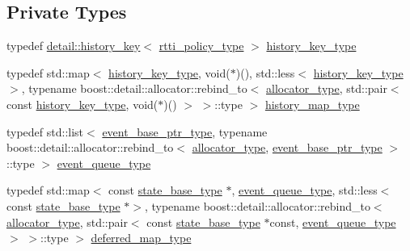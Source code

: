 \subsection*{Private Types}
\begin{DoxyCompactItemize}
\item 
typedef \mbox{\hyperlink{classboost_1_1statechart_1_1detail_1_1history__key}{detail\+::history\+\_\+key}}$<$ \mbox{\hyperlink{classboost_1_1statechart_1_1state__machine_af2a620c579a5248103aee4d3ccb4d632}{rtti\+\_\+policy\+\_\+type}} $>$ \mbox{\hyperlink{classboost_1_1statechart_1_1state__machine_a4f8e1e85e0ba11488c57318b61950e32}{history\+\_\+key\+\_\+type}}
\item 
typedef std\+::map$<$ \mbox{\hyperlink{classboost_1_1statechart_1_1state__machine_a4f8e1e85e0ba11488c57318b61950e32}{history\+\_\+key\+\_\+type}}, void($\ast$)(), std\+::less$<$ \mbox{\hyperlink{classboost_1_1statechart_1_1state__machine_a4f8e1e85e0ba11488c57318b61950e32}{history\+\_\+key\+\_\+type}} $>$, typename boost\+::detail\+::allocator\+::rebind\+\_\+to$<$ \mbox{\hyperlink{classboost_1_1statechart_1_1state__machine_a7345d6567cd1a829234bbb7f6c0715da}{allocator\+\_\+type}}, std\+::pair$<$ const \mbox{\hyperlink{classboost_1_1statechart_1_1state__machine_a4f8e1e85e0ba11488c57318b61950e32}{history\+\_\+key\+\_\+type}}, void($\ast$)() $>$ $>$\+::type $>$ \mbox{\hyperlink{classboost_1_1statechart_1_1state__machine_a9b8fdd7b5af3b0c9143f9d6fb4036ff7}{history\+\_\+map\+\_\+type}}
\item 
typedef std\+::list$<$ \mbox{\hyperlink{classboost_1_1statechart_1_1state__machine_aa2f1c567e2d1a66786d28769312dfa08}{event\+\_\+base\+\_\+ptr\+\_\+type}}, typename boost\+::detail\+::allocator\+::rebind\+\_\+to$<$ \mbox{\hyperlink{classboost_1_1statechart_1_1state__machine_a7345d6567cd1a829234bbb7f6c0715da}{allocator\+\_\+type}}, \mbox{\hyperlink{classboost_1_1statechart_1_1state__machine_aa2f1c567e2d1a66786d28769312dfa08}{event\+\_\+base\+\_\+ptr\+\_\+type}} $>$\+::type $>$ \mbox{\hyperlink{classboost_1_1statechart_1_1state__machine_a308a12082f9cd10b95118871f01e94da}{event\+\_\+queue\+\_\+type}}
\item 
typedef std\+::map$<$ const \mbox{\hyperlink{classboost_1_1statechart_1_1state__machine_a69cc258c29fcabec25c5dc8bedb7d530}{state\+\_\+base\+\_\+type}} $\ast$, \mbox{\hyperlink{classboost_1_1statechart_1_1state__machine_a308a12082f9cd10b95118871f01e94da}{event\+\_\+queue\+\_\+type}}, std\+::less$<$ const \mbox{\hyperlink{classboost_1_1statechart_1_1state__machine_a69cc258c29fcabec25c5dc8bedb7d530}{state\+\_\+base\+\_\+type}} $\ast$$>$, typename boost\+::detail\+::allocator\+::rebind\+\_\+to$<$ \mbox{\hyperlink{classboost_1_1statechart_1_1state__machine_a7345d6567cd1a829234bbb7f6c0715da}{allocator\+\_\+type}}, std\+::pair$<$ const \mbox{\hyperlink{classboost_1_1statechart_1_1state__machine_a69cc258c29fcabec25c5dc8bedb7d530}{state\+\_\+base\+\_\+type}} $\ast$const, \mbox{\hyperlink{classboost_1_1statechart_1_1state__machine_a308a12082f9cd10b95118871f01e94da}{event\+\_\+queue\+\_\+type}} $>$ $>$\+::type $>$ \mbox{\hyperlink{classboost_1_1statechart_1_1state__machine_a0ef83e245c8ae93aa6904990769c999f}{deferred\+\_\+map\+\_\+type}}
\end{DoxyCompactItemize}
